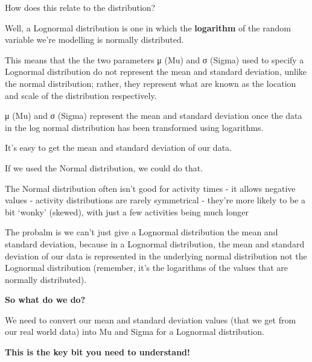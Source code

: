\documentclass[
  letterpaper,
  DIV=11,
  numbers=noendperiod]{scrreprt}
\begin{document}
How does this relate to the distribution?

Well, a Lognormal distribution is one in which the \textbf{logarithm} of
the random variable we're modelling is normally distributed.

This means that the the two parameters μ (Mu) and σ (Sigma) used to
specify a Lognormal distribution do not represent the mean and standard
deviation, unlike the normal distribution; rather, they represent what
are known as the location and scale of the distribution respectively.

μ (Mu) and σ (Sigma) represent the mean and standard deviation once the
data in the log normal distribution has been transformed using
logarithms.

It's easy to get the mean and standard deviation of our data.

If we used the Normal distribution, we could do that.

\begin{tcolorbox}[enhanced jigsaw, rightrule=.15mm, colback=white, colframe=quarto-callout-warning-color-frame, colbacktitle=quarto-callout-warning-color!10!white, toprule=.15mm, coltitle=black, opacityback=0, titlerule=0mm, bottomtitle=1mm, breakable, title=\textcolor{quarto-callout-warning-color}{\faExclamationTriangle}\hspace{0.5em}{Warning}, opacitybacktitle=0.6, toptitle=1mm, arc=.35mm, bottomrule=.15mm, leftrule=.75mm, left=2mm]

The Normal distribution often isn't good for activity times - it allows
negative values - activity distributions are rarely symmetrical -
they're more likely to be a bit `wonky' (skewed), with just a few
activities being much longer

\end{tcolorbox}

The probalm is we can't just give a Lognormal distribution the mean and
standard deviation, because in a Lognormal distribution, the mean and
standard deviation of our data is represented in the underlying normal
distribution not the Lognormal distribution (remember, it's the
logarithms of the values that are normally distributed).

\begin{tcolorbox}[enhanced jigsaw, rightrule=.15mm, colback=white, colframe=quarto-callout-tip-color-frame, colbacktitle=quarto-callout-tip-color!10!white, toprule=.15mm, coltitle=black, opacityback=0, titlerule=0mm, bottomtitle=1mm, breakable, title=\textcolor{quarto-callout-tip-color}{\faLightbulb}\hspace{0.5em}{Tip}, opacitybacktitle=0.6, toptitle=1mm, arc=.35mm, bottomrule=.15mm, leftrule=.75mm, left=2mm]

\textbf{So what do we do?}

We need to convert our mean and standard deviation values (that we get
from our real world data) into Mu and Sigma for a Lognormal
distribution.

\textbf{This is the key bit you need to understand!}

\end{tcolorbox}
\end{document}
